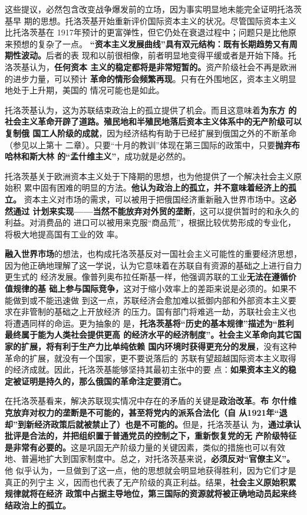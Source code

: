 这些提议，必然包含改变战争爆发前的立场，因为事实明显地未能完全证明托洛茨基早
期的思想。托洛茨基开始重新评价国际资本主义的状况。尽管国际资本主义比托洛茨基在
1917年预计的更富弹性，但它仍处在衰退过程中；问题只是比他原来预想的复杂了一点。
\textbf{“资本主义发展曲线”具有双元结构：既有长期趋势又有周期性波动。}后者的表
现和以前很相像，前者明显地变得平缓或者是开始下降。托洛茨基认为，\textbf{任何资本
主义的稳定都将是非常短暂的。}资产阶级社会不再是欧洲的进步力量，可以预计
\textbf{革命的情形会频繁再现}。只有在外围地区，资本主义明显地处于上升期，美国的
情况可能也是如此。

托洛茨基认为，这为苏联结束政治上的孤立提供了机会。而且这意味着\textbf{为东方
的社会主义革命开辟了道路。殖民地和半殖民地落后资本主义体系中的无产阶级可以复制俄
国工人阶级的成就}，因为经济结构有助于已经扩展到俄国之外的不断革命（参见以上第十
二章）。只要“十月的教训”体现在第三国际的政策中，只要\textbf{抛弃布哈林和斯大林
的“孟什维主义”}，成功就是必然的。

托洛茨基关于欧洲资本主义处于下降期的思想，也为他提供了一个解决社会主义原始积
累中固有困难的明显的方法。\textbf{他认为政治上的孤立，并不意味着经济上的孤立。}
资本主义对市场的需求，可以被用于把俄国经济重新融入世界市场中。这\textbf{必然通过
计划来实现——当然不能放弃对外贸的垄断}，这可以提供暂时的和永久的利益。对消费品的
进口可以被用来克服“商品荒”，根据比较优势形成的专业化，将极大地提高国有工业的效
率。

\textbf{融入世界市场}的想法，也构成托洛茨基反对一国社会主义可能性的重要经济思想，
因为他正确地理解了这一学说，认为它意味着在苏联自有资源的基础之上进行自力更生式的
经济发展。像普列奥布拉任斯基一样，他强调苏联的工业\textbf{无法在遵循价值规律的基
  础上参与国际竞争，}这对于缩小效率上的差距来说是必须的。如果不能做到或不能迅速做
到这一点，苏联经济会愈加难以抵御内部和外部资本主义要求在非管制的基础之上开放经济
的压力。国有部门将难逃一劫，苏联社会主义也将遭遇同样的命运。更为抽象的
是，\textbf{托洛茨基将“历史的基本规律”描述为“胜利最终属于能为人类社会提供更高
  的经济水平的经济制度”。社会主义革命向其它国家的扩展，将有利于生产力比单纯依赖
  国内环境时获得更充分的发展}，没有这种革命的扩展，就没有一个国家，更不要说落后的
苏联有望超越国际资本主义取得的经济成就。因此，托洛茨基能够坚持其最初主张中的要
点：\textbf{如果资本主义的稳定被证明是持久的，那么俄国的革命注定要消亡。}

在托洛茨基看来，解决苏联现实情况中存在的矛盾的关键是\textbf{政治改革}。\textbf{布
  尔什维克放弃对权力的垄断是不可能的，甚至将党内的派系合法化（自
  从1921年“退却”到新经济政策后就被禁止了）也是不可能的。}但是，托洛茨基认
为，\textbf{通过承认批评是合法的，并把组织置于普通党员的控制之下，重新恢复党的无
  产阶级特征是非常有必要的。}这是巩固无产阶级力量的关键因素，类似的措施也可以有效
地、普遍地扩大到国家制度中。总之，对托洛茨基来说，\textbf{必须反对“官僚主义”。}他
似乎认为，一旦做到了这一点，他的思想就会明显地获得胜利，因为它们才是真正的列宁主
义，因而也代表了无产阶级的真正利益。结果，\textbf{社会主义原始积累规律就将在经济
  政策中占据主导地位，第三国际的资源就将被正确地动员起来终结政治上的孤立。}

